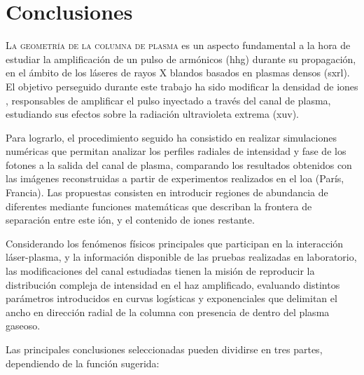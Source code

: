 \chapter{Conclusiones}\label{cap:5}
\lettrine{L}{a geometría de la columna de plasma} es un aspecto fundamental a la hora de estudiar la amplificación de un pulso de armónicos (\acrshort{hhg}) durante su propagación, en el ámbito de los láseres de rayos X blandos basados en plasmas densos (\acrshort{sxrl}). El objetivo perseguido durante este trabajo ha sido modificar la densidad de iones , responsables de amplificar el pulso inyectado a través del canal de plasma, estudiando sus efectos sobre la radiación ultravioleta extrema (\acrshort{xuv}).

Para lograrlo, el procedimiento seguido ha consistido en realizar simulaciones numéricas que permitan analizar los perfiles radiales de intensidad y fase de los fotones a la salida del canal de plasma, comparando los resultados obtenidos con las imágenes reconstruidas a partir de experimentos realizados en el \acrfull{loa} (París, Francia). Las propuestas consisten en introducir regiones de abundancia de  diferentes mediante funciones matemáticas que describan la frontera de separación entre este ión, y el contenido de iones restante.

Considerando los fenómenos físicos principales que participan en la interacción láser-plasma, y la información disponible de las pruebas realizadas en laboratorio, las modificaciones del canal estudiadas tienen la misión de reproducir la distribución compleja de intensidad en el haz amplificado, evaluando distintos parámetros introducidos en curvas logísticas y exponenciales que delimitan el ancho en dirección radial de la columna con presencia de  dentro del plasma gaseoso.

Las principales conclusiones seleccionadas pueden dividirse en tres partes, dependiendo de la función sugerida:

